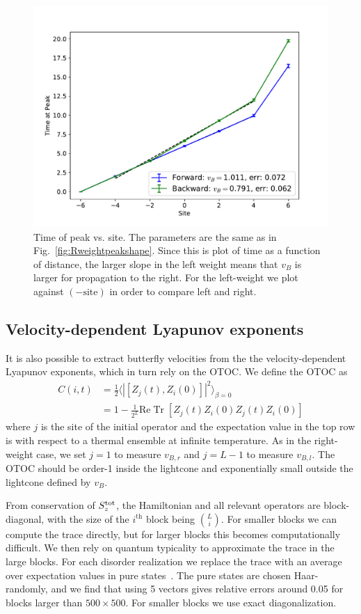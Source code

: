 \documentclass[aps,prx,reprint,superscriptaddress, longbibliography]{revtex4-1}
\newcommand{\charlie}[1]{{\color{Magenta}{{#1}}}}
\newcommand{\Tr}{ \mbox{Tr}}
\renewcommand{\Re}{ \mbox{Re}}
\newcommand{\Sz}{S_z^{\rm tot}}
\newcommand{\half}{\frac{1}{2}}
\begin{document}
\begin{figure}
	\includegraphics[width=\columnwidth]{Rweighthalftimes}
	\caption{Time of peak vs. site. The parameters are the same as in Fig.~\ref{fig:Rweightpeakshape}. Since this is plot of time as a function of distance, the larger slope in the left weight means that $v_B$ is larger for propagation to the right. For the left-weight we plot against $(-\text{site})$ in order to compare left and right.}
	\label{fig:Rweightpeaktimes}
\end{figure}

\subsection{Velocity-dependent Lyapunov exponents}

It is also possible to extract butterfly velocities from the the velocity-dependent Lyapunov exponents, which in turn rely on the OTOC. We define the OTOC as 
\begin{align}
C(i,t) & = \half \langle|[Z_j(t),Z_i(0)]|^2\rangle_{\beta=0}\nonumber\\
&= 1 - \frac{1}{2^{L}}\Re\;\Tr\;[Z_j(t)Z_i(0)Z_j(t)Z_i(0)]
\end{align}
where $j$ is the site of the initial operator and the expectation value in the top row is with respect to a thermal ensemble at infinite temperature. As in the right-weight case, we set $j=1$ to measure $v_{B,r}$ and $j=L-1$ to measure $v_{B,l}$. The OTOC should be order-1 inside the lightcone and exponentially small outside the lightcone defined by $v_B$.

\charlie{Move this paragraph to an appendix?}
From conservation of $\Sz$, the Hamiltonian and all relevant operators are block-diagonal, with the size of the $i^\text{th}$ block being $\binom{L}{i}$. For smaller blocks we can compute the trace directly, but for larger blocks this becomes computationally difficult. We then rely on quantum typicality to approximate the trace in the large blocks. For each disorder realization we replace the trace with an average over expectation values in pure states~\cite{Luitz2017}. The pure states are chosen Haar-randomly, and we find that using 5 vectors gives relative errors around 0.05 for blocks larger than $500\times 500$. For smaller blocks we use exact diagonalization.
\end{document}
